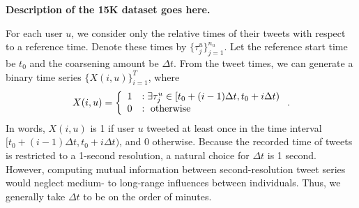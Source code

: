\documentclass[12pt]{article}
\begin{document}
\textbf{Description of the 15K dataset goes here.}

For each user $u$, we consider only the relative times of their tweets with respect to a reference time. Denote these times by $\{ \tau^{u}_{j}\}_{j = 1}^{n_{u}}$. Let the reference start time be $t_{0}$ and the coarsening amount be $\Delta t$. From the tweet times, we can generate a binary time series $\{ X(i, u)\}_{i = 1}^{T}$, where
\begin{align}
	X(i, u) = \left\{ \begin{array}{cl}
		1 &: \text{$ \exists \tau^{u}_{j} \in [t_{0} + (i - 1) \Delta t, t_{0} + i \Delta t)$} \\
		0 &: \text{ otherwise}
	\end{array}\right. .
\end{align}
In words, $X(i, u)$ is 1 if user $u$ tweeted at least once in the time interval $[t_{0} + (i - 1) \Delta t, t_{0} + i \Delta t)$, and 0 otherwise. Because the recorded time of tweets is restricted to a 1-second resolution, a natural choice for $\Delta t$ is 1 second. However, computing mutual information between second-resolution tweet series would neglect medium- to long-range influences between individuals. Thus, we generally take $\Delta t$ to be on the order of minutes.



\end{document}
